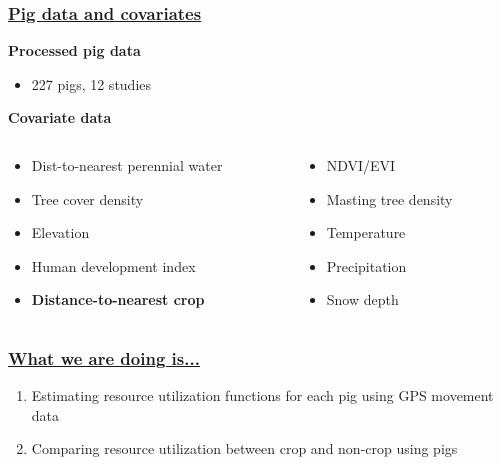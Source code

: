 \documentclass[xcolor=dvipsnames]{beamer}
\begin{document}
\begin{frame}[t]
\frametitle{\underline{Pig data and covariates}}

  \textbf{Processed pig data}

  \begin{itemize}
    \item 227 pigs, 12 studies
  \end{itemize}

  \bigskip

  \textbf{Covariate data}


  \begin{columns}
    \begin{column}{0.5\textwidth}

      \begin{itemize}
        \item Dist-to-nearest perennial water
        \item Tree cover density
        \item Elevation
        \item Human development index
        \item \textbf{Distance-to-nearest crop}
      \end{itemize}
       
    \end{column}
    \begin{column}{0.5\textwidth}

      \begin{itemize}
        \item NDVI/EVI
        \item Masting tree density
        \item Temperature
        \item Precipitation
        \item Snow depth
      \end{itemize}
    
    \end{column}
  \end{columns}



\end{frame}


\begin{frame}[t]
\frametitle{\underline{What we are doing is...}}

  \begin{enumerate}
    \item Estimating resource utilization functions for each pig using GPS movement data
    \item Comparing resource utilization between crop and non-crop using pigs
  \end{enumerate}

\end{frame}
\end{document}
